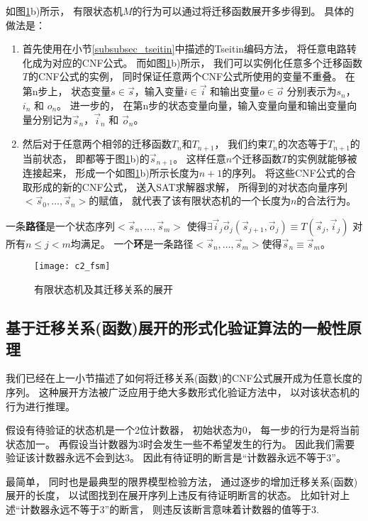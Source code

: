 如图\ref{c2_fsm}b)所示，
有限状态机$M$的行为可以通过将迁移函数展开多步得到。
具体的做法是：
\begin{enumerate}
\item 首先使用在小节\ref{subsubsec_tseitin}中描述的Tseitin编码方法，
将任意电路转化成为对应的CNF公式。
而如图\ref{c2_fsm}b)所示，
我们可以实例化任意多个迁移函数$T$的CNF公式的实例，
同时保证任意两个CNF公式所使用的变量不重叠。
在第n步上，
状态变量$s\in\vec{s}$，输入变量$i\in\vec{i}$ 和输出变量$o\in\vec{o}$
分别表示为$s_n$，$i_n$ 和 $o_n$。
进一步的，
在第n步的状态变量向量，输入变量向量和输出变量向量分别记为$\vec{s}_n$，$\vec{i}_n$ 和 $\vec{o}_n$。

\item 然后对于任意两个相邻的迁移函数$T_n$和$T_{n+1}$，
我们约束$T_n$的次态等于$T_{n+1}$的当前状态，
即都等于图\ref{c2_fsm}b)的$\vec{s}_{n+1}$。
这样任意$n$个迁移函数$T$的实例就能够被连接起来，
形成一个如图\ref{c2_fsm}b)所示长度为$n+1$的序列。
将这些CNF公式的合取形成的新的CNF公式，
送入SAT求解器求解，
所得到的对状态向量序列$<\vec{s}_0,\dots,\vec{s}_n>$的赋值，
就代表了该有限状态机的一个长度为$n$的合法行为。
\end{enumerate}


一条\textbf{路径}是一个状态序列$<\vec{s}_n,\dots,\vec{s}_m>$ 使得$\exists \vec{i}_j\vec{o}_j (\vec{s}_{j+1},\vec{o}_j)\equiv T(\vec{s}_j,\vec{i}_j)$ 对所有$n\le j< m$均满足。
一个\textbf{环}是一条路径$<\vec{s}_n,\dots,\vec{s}_m>$使得$\vec{s}_n\equiv \vec{s}_m$。


\begin{figure}[t]
  \centering
  \texttt{[image: c2\_fsm]}
  \caption{有限状态机及其迁移关系的展开}
  \label{c2_fsm}
\end{figure}



\subsection{基于迁移关系(函数)展开的形式化验证算法的一般性原理}\label{subsec_}
我们已经在上一小节描述了如何将迁移关系(函数)的CNF公式展开成为任意长度的序列。
这种展开方法被广泛应用于绝大多数形式化验证方法中，
以对该状态机的行为进行推理。

假设有待验证的状态机是一个2位计数器，
初始状态为0，
每一步的行为是将当前状态加一。
再假设当计数器为3时会发生一些不希望发生的行为。
因此我们需要验证该计数器永远不会到达3。
因此有待证明的断言是“计数器永远不等于3”。

最简单，
同时也是最典型的限界模型检验方法，
通过逐步的增加迁移关系(函数)展开的长度，
以试图找到在展开序列上违反有待证明断言的状态。
比如针对上述“计数器永远不等于3”的断言，
则违反该断言意味着计数器的值等于3.

